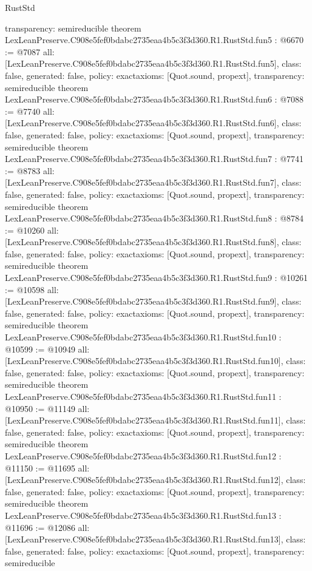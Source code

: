 \begin{lexlean}{RustStd}
\begin{coremodule}
{  transparency: semireducible
}
theorem LexLeanPreserve.C908e5fef0bdabc2735eaa4b5c3f3d360.R1.RustStd.fun5 : @6670 := @7087 {
  all: [LexLeanPreserve.C908e5fef0bdabc2735eaa4b5c3f3d360.R1.RustStd.fun5],
  class: false,
  generated: false,
  policy: exact{axioms: [Quot.sound, propext]},
  transparency: semireducible
}
theorem LexLeanPreserve.C908e5fef0bdabc2735eaa4b5c3f3d360.R1.RustStd.fun6 : @7088 := @7740 {
  all: [LexLeanPreserve.C908e5fef0bdabc2735eaa4b5c3f3d360.R1.RustStd.fun6],
  class: false,
  generated: false,
  policy: exact{axioms: [Quot.sound, propext]},
  transparency: semireducible
}
theorem LexLeanPreserve.C908e5fef0bdabc2735eaa4b5c3f3d360.R1.RustStd.fun7 : @7741 := @8783 {
  all: [LexLeanPreserve.C908e5fef0bdabc2735eaa4b5c3f3d360.R1.RustStd.fun7],
  class: false,
  generated: false,
  policy: exact{axioms: [Quot.sound, propext]},
  transparency: semireducible
}
theorem LexLeanPreserve.C908e5fef0bdabc2735eaa4b5c3f3d360.R1.RustStd.fun8 : @8784 := @10260 {
  all: [LexLeanPreserve.C908e5fef0bdabc2735eaa4b5c3f3d360.R1.RustStd.fun8],
  class: false,
  generated: false,
  policy: exact{axioms: [Quot.sound, propext]},
  transparency: semireducible
}
theorem LexLeanPreserve.C908e5fef0bdabc2735eaa4b5c3f3d360.R1.RustStd.fun9 : @10261 := @10598 {
  all: [LexLeanPreserve.C908e5fef0bdabc2735eaa4b5c3f3d360.R1.RustStd.fun9],
  class: false,
  generated: false,
  policy: exact{axioms: [Quot.sound, propext]},
  transparency: semireducible
}
theorem LexLeanPreserve.C908e5fef0bdabc2735eaa4b5c3f3d360.R1.RustStd.fun10 : @10599 := @10949 {
  all: [LexLeanPreserve.C908e5fef0bdabc2735eaa4b5c3f3d360.R1.RustStd.fun10],
  class: false,
  generated: false,
  policy: exact{axioms: [Quot.sound, propext]},
  transparency: semireducible
}
theorem LexLeanPreserve.C908e5fef0bdabc2735eaa4b5c3f3d360.R1.RustStd.fun11 : @10950 := @11149 {
  all: [LexLeanPreserve.C908e5fef0bdabc2735eaa4b5c3f3d360.R1.RustStd.fun11],
  class: false,
  generated: false,
  policy: exact{axioms: [Quot.sound, propext]},
  transparency: semireducible
}
theorem LexLeanPreserve.C908e5fef0bdabc2735eaa4b5c3f3d360.R1.RustStd.fun12 : @11150 := @11695 {
  all: [LexLeanPreserve.C908e5fef0bdabc2735eaa4b5c3f3d360.R1.RustStd.fun12],
  class: false,
  generated: false,
  policy: exact{axioms: [Quot.sound, propext]},
  transparency: semireducible
}
theorem LexLeanPreserve.C908e5fef0bdabc2735eaa4b5c3f3d360.R1.RustStd.fun13 : @11696 := @12086 {
  all: [LexLeanPreserve.C908e5fef0bdabc2735eaa4b5c3f3d360.R1.RustStd.fun13],
  class: false,
  generated: false,
  policy: exact{axioms: [Quot.sound, propext]},
  transparency: semireducible
}
\end{coremodule}
\end{lexlean}
